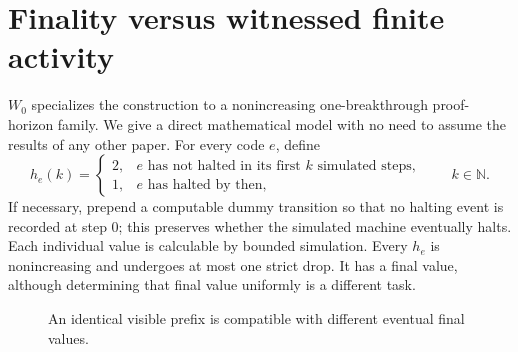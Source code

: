 \documentclass[11pt,letterpaper]{article}
\newcommand{\N}{\mathbb N}\newcommand{\Ledge}{\mathcal L}\newcommand{\Cert}{\mathsf{Cert}}\newcommand{\Att}{\mathsf{Att}}\newcommand{\Relay}{\mathsf{Relay}}\newcommand{\Trust}{\mathsf{Trusted}}\newcommand{\K}{\mathsf{K}}\newcommand{\View}{\mathsf{View}}\newcommand{\Proof}{\mathsf{Proof}}\newcommand{\Msg}{\mathsf{Msg}}\newcommand{\Auth}{\mathsf{Auth}}\newcommand{\Good}{\mathsf{Good}}
\begin{document}
\section{Finality versus witnessed finite activity}
$W_0$ specializes the construction to a nonincreasing one-breakthrough proof-horizon family. We give a direct mathematical model with no need to assume the results of any other paper. For every code $e$, define
\[
h_e(k)=\begin{cases}2,&e\text{ has not halted in its first $k$ simulated steps},\\1,&e\text{ has halted by then},\end{cases}\qquad k\in\N.
\]
If necessary, prepend a computable dummy transition so that no halting event is recorded at step $0$; this preserves whether the simulated machine eventually halts. Each individual value is calculable by bounded simulation. Every $h_e$ is nonincreasing and undergoes at most one strict drop. It has a final value, although determining that final value uniformly is a different task.

\begin{figure}[htbp]\centering
{}
\caption{An identical visible prefix is compatible with different eventual final values.}
\end{figure}
\end{document}
